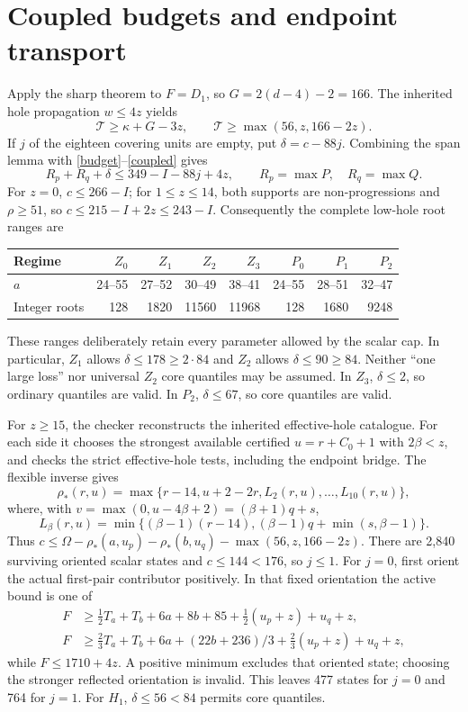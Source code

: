 \documentclass[11pt,a4paper]{article}
\newcommand{\T}{\mathcal T}
\begin{document}
\section{Coupled budgets and endpoint transport}
Apply the sharp theorem to $F=D_1$, so
$G=2(d-4)-2=166$. The inherited hole propagation
$w\le4z$ yields
\begin{equation}\label{coupled}
 \T\ge\kappa+G-3z,\qquad
 \T\ge\max(56,z,166-2z).
\end{equation}
If $j$ of the eighteen covering units are empty, put $\delta=c-88j$.
Combining the span lemma with \eqref{budget}--\eqref{coupled} gives
\begin{equation}\label{span}
 R_p+R_q+\delta\le349-I-88j+4z,
 \qquad R_p=\max P,\quad R_q=\max Q.
\end{equation}
For $z=0$, $c\le266-I$; for $1\le z\le14$, both supports are
non-progressions and $\rho\ge51$, so $c\le215-I+2z\le243-I$.
Consequently the complete low-hole root ranges are
\begin{center}
\begin{tabular}{lrrrrrrr}\toprule
Regime&$Z_0$&$Z_1$&$Z_2$&$Z_3$&$P_0$&$P_1$&$P_2$\\\midrule
$a$&24--55&27--52&30--49&38--41&24--55&28--51&32--47\\
Integer roots&128&1820&11560&11968&128&1680&9248\\\bottomrule
\end{tabular}
\end{center}
These ranges deliberately retain every parameter allowed by the scalar
cap. In particular, $Z_1$ allows $\delta\le178\ge2\cdot84$ and $Z_2$
allows $\delta\le90\ge84$. Neither ``one large loss'' nor universal
$Z_2$ core quantiles may be assumed. In $Z_3$, $\delta\le2$, so ordinary
quantiles are valid. In $P_2$, $\delta\le67$, so core quantiles are valid.

For $z\ge15$, the checker reconstructs the inherited effective-hole
catalogue. For each side it chooses the strongest available certified
$u=r+C_0+1$ with $2\beta<z$, and checks the strict effective-hole tests,
including the endpoint bridge. The flexible inverse gives
\[
 \rho_*(r,u)=\max\{r-14,u+2-2r,L_2(r,u),\ldots,L_{10}(r,u)\},
\]
where, with $v=\max(0,u-4\beta+2)=(\beta+1)q+s$,
\[
 L_\beta(r,u)=\min\{(\beta-1)(r-14),(\beta-1)q+\min(s,\beta-1)\}.
\]
Thus $c\le\Omega-\rho_*(a,u_p)-\rho_*(b,u_q)-\max(56,z,166-2z)$.
There are 2,840 surviving oriented scalar states and $c\le144<176$,
so $j\le1$. For $j=0$, first orient the actual first-pair contributor
positively. In that fixed orientation the active bound is one of
\begin{align*}
 F&\ge\tfrac12T_a+T_b+6a+8b+85+\tfrac12(u_p+z)+u_q+z,\\
 F&\ge\tfrac23T_a+T_b+6a+(22b+236)/3+\tfrac23(u_p+z)+u_q+z,
\end{align*}
while $F\le1710+4z$. A positive minimum excludes that oriented state;
choosing the stronger reflected orientation is invalid.
This leaves 477 states for $j=0$ and 764 for $j=1$.
For $H_1$, $\delta\le56<84$ permits core quantiles.
\end{document}
